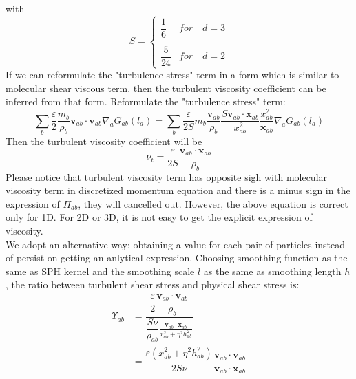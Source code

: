 \documentclass[10pt,a4paper]{article}
\begin{document}
with
\begin{equation}
S= 
\begin{cases} 
      \dfrac{1}{6} & for  \quad d=3 \\
      \\
     \dfrac{5}{24}  & for  \quad d=2 
\end{cases}
\end{equation}
If we can reformulate the "turbulence stress" term in a form which is similar to molecular shear viscous term. then the turbulent viscosity coefficient can be inferred from that form.
Reformulate the "turbulence stress" term:
\begin{equation}
 \sum_b \dfrac{\varepsilon}{2} \dfrac{m_b}{\rho_b} \textbf{v}_{ab} \cdot \textbf{v}_{ab} \nabla_a G_{ab}(l_a)= \sum_b \dfrac{\varepsilon}{2S} m_b \dfrac{\textbf{v}_{ab}}{\rho_b} \dfrac{S \textbf{v}_{ab} \cdot \textbf{x}_{ab}}{x_{ab}^2} \dfrac{x_{ab}^2}{\textbf{x}_{ab}} \nabla_a G_{ab}(l_a) 
\end{equation}
Then the turbulent viscosity coefficient will be
\begin{equation}
\nu_t = \dfrac{\varepsilon}{2S} \dfrac{\textbf{v}_{ab} \cdot \textbf{x}_{ab}}{\rho_b}
\end{equation}
Please notice that turbulent viscosity term has opposite sigh with molecular viscosity term in discretized momentum equation and there is a minus sign in the expression of $\Pi_{ab}$, they will cancelled out.
However, the above equation is correct only for 1D. For 2D or 3D, it is not easy to get the explicit expression of viscosity. \\
We adopt an alternative way: obtaining a value for each pair of particles instead of persist on getting an anlytical expression. Choosing smoothing function as the same as SPH kernel and the smoothing scale $l$ as the same as smoothing length $h$, the ratio between turbulent shear stress and physical shear stress is: 
\begin{equation}
\begin{split}
\Upsilon_{ab} &= \dfrac{\dfrac{\varepsilon}{2} \dfrac{\textbf{v}_{ab} \cdot \textbf{v}_{ab}}{\rho_b}}{\dfrac{S \nu}{\rho_{ab}} \frac{\textbf{v}_{ab} \cdot \textbf{x}_{ab}}{x_{ab}^2 + \eta^2 h_{ab}^2}} \\
 & = \dfrac{\varepsilon (x_{ab}^2 + \eta^2 h_{ab}^2)}{2 S \nu} \dfrac{\textbf{v}_{ab} \cdot \textbf{v}_{ab}}{\textbf{v}_{ab} \cdot \textbf{x}_{ab}}
\end{split}
\end{equation}
\end{document}
